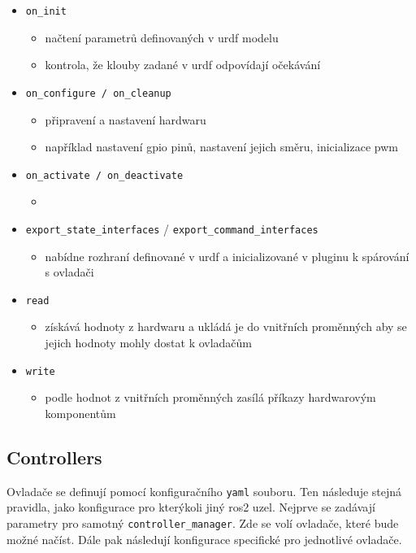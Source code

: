 \begin{itemize}[leftmargin=*]
	\item{\verb|on_init|}
	\vspace*{-0.5em}
	\begin{itemize}
		\item{načtení parametrů definovaných v urdf modelu}
		\item{kontrola, že klouby zadané v urdf odpovídají očekávání}
	\end{itemize}
	\item{\verb|on_configure / on_cleanup|}
	\vspace*{-0.5em}
	\begin{itemize}
		\item{připravení a nastavení hardwaru}
		\item{například nastavení gpio pinů, nastavení jejich směru, inicializace pwm}
	\end{itemize}
	\item{\verb|on_activate / on_deactivate|}
	\vspace*{-0.5em}
	\begin{itemize}
		\item{}
	\end{itemize}
	\item{\verb|export_state_interfaces| / \verb|export_command_interfaces|}
	\vspace*{-0.5em}
	\begin{itemize}
		\item{nabídne rozhraní definované v urdf a inicializované v pluginu k spárování s ovladači}
	\end{itemize}
	\item{\verb|read|}
	\vspace*{-0.5em}
	\begin{itemize}
		\item{získává hodnoty z hardwaru a ukládá je do vnitřních proměnných aby se jejich hodnoty mohly dostat k ovladačům}
	\end{itemize}
	\item{\verb|write|}
	\vspace*{-0.5em}
	\begin{itemize}
		\item{podle hodnot z vnitřních proměnných zasílá příkazy hardwarovým komponentům}
	\end{itemize}
\end{itemize}

\subsection*{Controllers}
Ovladače se definují pomocí konfiguračního \verb|yaml| souboru. Ten následuje stejná pravidla, jako konfigurace pro kterýkoli jiný ros2 uzel. Nejprve se zadávají parametry pro samotný \verb|controller_manager|. Zde se volí ovladače, které bude možné načíst. Dále pak následují konfigurace specifické pro jednotlivé ovladače.

